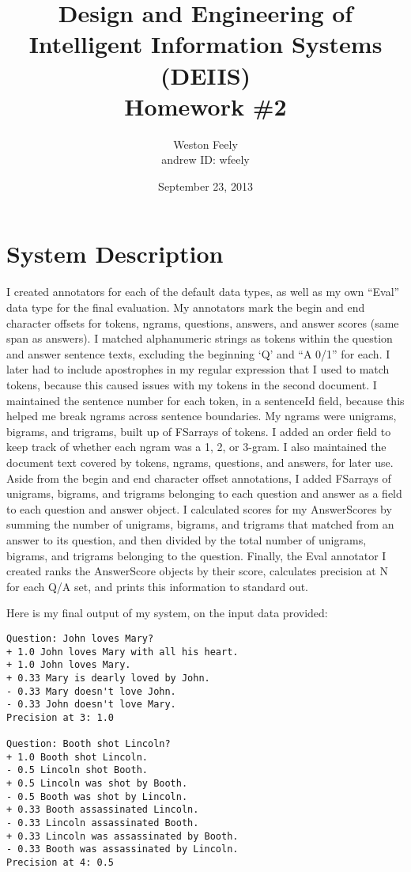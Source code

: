 \documentclass[11pt]{article}
\begin{document}
\title{\textbf{Design and Engineering of Intelligent Information Systems (DEIIS)}\\
	Homework \#2}
\author{Weston Feely \\ andrew ID: wfeely}
\date{September 23, 2013}
\maketitle

\section*{System Description}
I created annotators for each of the default data types, as well as my own ``Eval'' data type for the final evaluation. My annotators mark the begin and end character offsets for tokens, ngrams, questions, answers, and answer scores (same span as answers). I matched alphanumeric strings as tokens within the question and answer sentence texts, excluding the beginning `Q' and ``A 0/1'' for each. I later had to include apostrophes in my regular expression that I used to match tokens, because this caused issues with my tokens in the second document. I maintained the sentence number for each token, in a sentenceId field, because this helped me break ngrams across sentence boundaries. My ngrams were unigrams, bigrams, and trigrams, built up of FSarrays of tokens. I added an order field to keep track of whether each ngram was a 1, 2, or 3-gram. I also maintained the document text covered by tokens, ngrams, questions, and answers, for later use. Aside from the begin and end character offset annotations, I added FSarrays of unigrams, bigrams, and trigrams belonging to each question and answer as a field to each question and answer object. I calculated scores for my AnswerScores by summing the number of unigrams, bigrams, and trigrams that matched from an answer to its question, and then divided by the total number of unigrams, bigrams, and trigrams belonging to the question. Finally, the Eval annotator I created ranks the AnswerScore objects by their score, calculates precision at N for each Q/A set, and prints this information to standard out.

Here is my final output of my system, on the input data provided:

\begin{verbatim}
Question: John loves Mary?
+ 1.0 John loves Mary with all his heart.
+ 1.0 John loves Mary.
+ 0.33 Mary is dearly loved by John.
- 0.33 Mary doesn't love John.
- 0.33 John doesn't love Mary.
Precision at 3: 1.0

Question: Booth shot Lincoln?
+ 1.0 Booth shot Lincoln.
- 0.5 Lincoln shot Booth.
+ 0.5 Lincoln was shot by Booth.
- 0.5 Booth was shot by Lincoln.
+ 0.33 Booth assassinated Lincoln.
- 0.33 Lincoln assassinated Booth.
+ 0.33 Lincoln was assassinated by Booth.
- 0.33 Booth was assassinated by Lincoln.
Precision at 4: 0.5
\end{verbatim}
\end{document}
